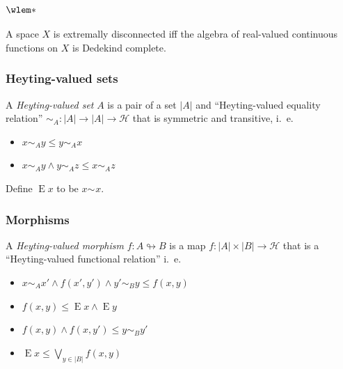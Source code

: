\documentclass{beamer}
\theoremstyle{theorem}
\newtheorem{trditev}{Proposition}
\theoremstyle{definition}
\theoremstyle{remark}
\def\h{ℋ}
\newcommand{\eq}[3][]{{#2} \sim_{#1} {#3}}
\DeclareMathOperator{\e}{E}
\newcommand{\carr}[1]{\left\vert {#1} \right\vert}
\begin{document}




\begin{frame}
  \frametitle{\(\wlem*\)}

  \begin{corollary}
    A space \(X\) is extremally disconnected iff the algebra of real-valued continuous functions on \(X\) is Dedekind complete.
  \end{corollary}

\end{frame}

\begin{frame}
  \frametitle{Heyting-valued sets}

  \begin{definition}
    A \emph{Heyting-valued set} \(A\) is a pair of a set \(\carr A\) and ``Heyting-valued equality relation'' \(\eq[A]{}{} : \carr A → \carr A → \h\) that is symmetric and transitive, i.~e.
    \begin{itemize}
    \item \(\eq[A] x y ≤ \eq[A] y x\)
    \item \(\eq[A] x y ∧ \eq[A] y z ≤ \eq[A] x z\)
    \end{itemize}
    Define \(\e x\) to be \(\eq x x\).
  \end{definition}

\end{frame}

\begin{frame}
  \frametitle{Morphisms}

  \begin{definition}
    A \emph{Heyting-valued morphism} \(f : A ↬ B\) is a map \(f : \carr A × \carr B → \h\) that is a ``Heyting-valued functional relation'' i.~e.
    \begin{itemize}
    \item \(\eq[A] x {x'} ∧ f(x',y') ∧ \eq[B] {y'} y ≤ f(x,y)\)
    \item \(f(x, y) ≤ \e x ∧ \e y\)
    \item \(f(x, y) ∧ f(x, y') ≤ \eq[B] y {y'}\)
    \item \(\e x ≤ ⋁_{y ∈ \carr B} f(x, y)\)
    \end{itemize}
  \end{definition}
\end{frame}
\end{document}
